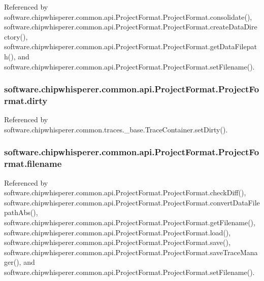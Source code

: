 Referenced by software.\+chipwhisperer.\+common.\+api.\+Project\+Format.\+Project\+Format.\+consolidate(), software.\+chipwhisperer.\+common.\+api.\+Project\+Format.\+Project\+Format.\+create\+Data\+Directory(), software.\+chipwhisperer.\+common.\+api.\+Project\+Format.\+Project\+Format.\+get\+Data\+Filepath(), and software.\+chipwhisperer.\+common.\+api.\+Project\+Format.\+Project\+Format.\+set\+Filename().

\hypertarget{classsoftware_1_1chipwhisperer_1_1common_1_1api_1_1ProjectFormat_1_1ProjectFormat_a364679c4d113e08b323fade8c9e61c8b}{}
\subsubsection[{dirty}]{\setlength{\rightskip}{0pt plus 5cm}software.\+chipwhisperer.\+common.\+api.\+Project\+Format.\+Project\+Format.\+dirty}\label{classsoftware_1_1chipwhisperer_1_1common_1_1api_1_1ProjectFormat_1_1ProjectFormat_a364679c4d113e08b323fade8c9e61c8b}


Referenced by software.\+chipwhisperer.\+common.\+traces.\+\_\+base.\+Trace\+Container.\+set\+Dirty().

\hypertarget{classsoftware_1_1chipwhisperer_1_1common_1_1api_1_1ProjectFormat_1_1ProjectFormat_a95a501ab20646851ed4320c6db7b9297}{}
\subsubsection[{filename}]{\setlength{\rightskip}{0pt plus 5cm}software.\+chipwhisperer.\+common.\+api.\+Project\+Format.\+Project\+Format.\+filename}\label{classsoftware_1_1chipwhisperer_1_1common_1_1api_1_1ProjectFormat_1_1ProjectFormat_a95a501ab20646851ed4320c6db7b9297}


Referenced by software.\+chipwhisperer.\+common.\+api.\+Project\+Format.\+Project\+Format.\+check\+Diff(), software.\+chipwhisperer.\+common.\+api.\+Project\+Format.\+Project\+Format.\+convert\+Data\+Filepath\+Abs(), software.\+chipwhisperer.\+common.\+api.\+Project\+Format.\+Project\+Format.\+get\+Filename(), software.\+chipwhisperer.\+common.\+api.\+Project\+Format.\+Project\+Format.\+load(), software.\+chipwhisperer.\+common.\+api.\+Project\+Format.\+Project\+Format.\+save(), software.\+chipwhisperer.\+common.\+api.\+Project\+Format.\+Project\+Format.\+save\+Trace\+Manager(), and software.\+chipwhisperer.\+common.\+api.\+Project\+Format.\+Project\+Format.\+set\+Filename().

